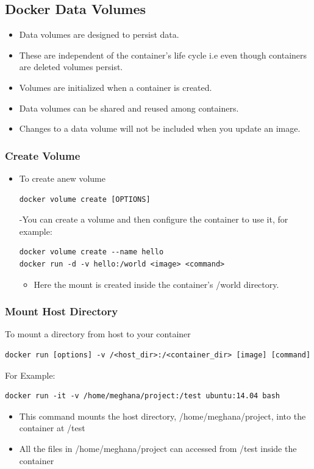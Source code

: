 \documentclass[11pt]{article}
\begin{document}
\subsection{Docker Data Volumes}
\label{sec:orgheadline33}
\begin{itemize}
\item Data volumes are designed to persist data.
\item These are independent of the container's life cycle i.e even though
containers are deleted volumes persist.
\item Volumes are initialized when a container is created.
\item Data volumes can be shared and reused among containers.
\item Changes to a data volume will not be included when you update an image.
\end{itemize}
\subsubsection{Create Volume}
\label{sec:orgheadline27}
\begin{itemize}
\item To create anew volume
\begin{verbatim}
docker volume create [OPTIONS]
\end{verbatim}
-You can create a volume and then configure the container to use it, for example:
\begin{verbatim}
docker volume create --name hello
docker run -d -v hello:/world <image> <command>
\end{verbatim}
\begin{itemize}
\item Here the mount is created inside the container's /world directory.
\end{itemize}
\end{itemize}
\subsubsection{Mount Host Directory}
\label{sec:orgheadline28}
To mount a directory from host to your container
\begin{verbatim}
docker run [options] -v /<host_dir>:/<container_dir> [image] [command]
\end{verbatim}
For Example:
\begin{verbatim}
docker run -it -v /home/meghana/project:/test ubuntu:14.04 bash
\end{verbatim}
\begin{itemize}
\item This command mounts the host directory, /home/meghana/project, into the
container at /test
\item All the files in /home/meghana/project can accessed from /test inside the
container
\end{itemize}
\end{document}
